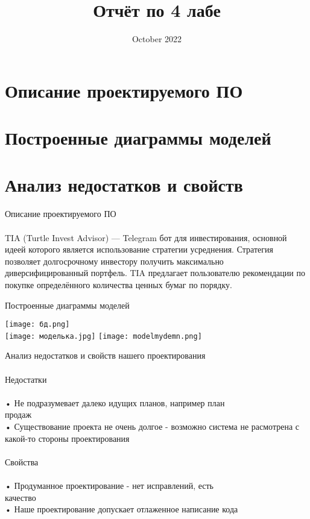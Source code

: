 \documentclass{article}
\title{Отчёт по 4 лабе}
\date{October 2022}
\begin{document}
\maketitle

\section{Описание проектируемого ПО}
\section{Построенные диаграммы моделей}
\section{Анализ недостатков и свойств}

\newpage
\huge {Описание проектируемого ПО} \\ \\
\large{TIA (Turtle Invest Advisor) — Telegram бот для инвестирования, основной идеей которого является использование стратегии усреднения. Стратегия позволяет долгосрочному инвестору получить максимально диверсифицированный портфель. TIA предлагает пользователю рекомендации по покупке определённого количества ценных бумаг по порядку.}

\newpage
\huge{Построенные диаграммы моделей}

\texttt{[image: бд.png]} \\
\texttt{[image: моделька.jpg]}
\texttt{[image: modelmydemn.png]}

\newpage
\huge{Анализ недостатков и свойств нашего проектирования} \\ \\
\Large{Недостатки} \\ \\
\large{• Не подразумевает далеко идущих планов, например план \\ продаж} \\
\large{• Существование проекта не очень долгое - возможно система не расмотрена с какой-то стороны проектирования}
\\ \\
\Large{Свойства} \\ \\
\large{• Продуманное проектирование - нет исправлений, есть \\ качество} \\
\large{• Наше проектирование допускает отлаженное написание кода} \\
\end{document}
